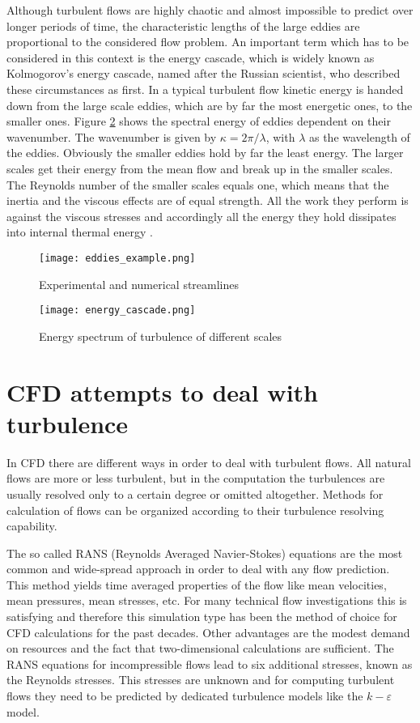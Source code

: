Although turbulent flows are highly chaotic and almost impossible to predict over longer periods of time, the characteristic lengths of the large eddies are proportional to the considered flow problem. An important term which has to be considered in this context is the energy cascade, which is widely known as Kolmogorov's energy cascade, named after the Russian scientist, who described these circumstances as first. In a typical turbulent flow kinetic energy is handed down from the large scale eddies, which are by far the most energetic ones, to the smaller ones. Figure \ref{fig:cascade} shows the spectral energy of eddies dependent on their wavenumber. The wavenumber is given by $\kappa = 2 \pi /\lambda$, with $\lambda$ as the wavelength of the eddies. Obviously the smaller eddies hold by far the least energy. The larger scales get their energy from the mean flow and break up in the smaller scales. The Reynolds number of the smaller scales equals one, which means that the inertia and the viscous effects are of equal strength. All the work they perform is against the viscous stresses and accordingly all the energy they hold dissipates into internal thermal energy \cite{versteeg, hassler}.

\begin{figure}[ht]
\centering
\texttt{[image: eddies\_example.png]}
\caption{\cite[p.13]{ochoa} Experimental and numerical streamlines}
\label{fig:example}
\end{figure}

\begin{figure}[ht]
\centering
\texttt{[image: energy\_cascade.png]}
\caption{\cite[p.43]{versteeg} Energy spectrum of turbulence of different scales}
\label{fig:cascade}
\end{figure}

\section{CFD attempts to deal with turbulence}
In CFD there are different ways in order to deal with turbulent flows. All natural flows are more or less turbulent, but in the computation the turbulences are usually resolved only to a certain degree or omitted altogether. Methods for calculation of flows can be organized according to their turbulence resolving capability.

The so called RANS (Reynolds Averaged Navier-Stokes) equations are the most common and wide-spread approach in order to deal with any flow prediction.
This method yields time averaged properties of the flow like mean velocities, mean pressures, mean stresses, etc. For many technical flow investigations this is satisfying and therefore this simulation type has been the method of choice for CFD calculations for the past decades. Other advantages are the modest demand on resources and the fact that two-dimensional calculations are sufficient.
The RANS equations for incompressible flows lead to six additional stresses, known as the Reynolds stresses. This stresses are unknown and for computing turbulent flows they need to be predicted by dedicated turbulence models like the $k-\varepsilon$ model.

